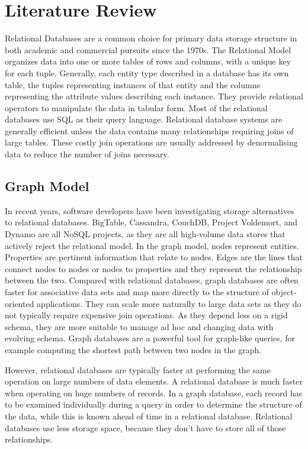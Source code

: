 \documentclass[12pt, oneside]{book}
\begin{document}
\pagebreak

\chapter{Literature Review}
Relational Databases are a common choice for primary data storage structure in both academic and commercial pursuits since the 1970s. The Relational Model organizes data into one or more tables of rows and columns, with a unique key for each tuple. Generally, each entity type described in a database has its own table, the tuples representing instances of that entity and the columns representing the attribute values describing each instance. They provide relational operators to manipulate the data in tabular form. Most of the relational databases use SQL as their query language. Relational database systems are generally efficient unless the data contains many relationships requiring joins of large tables. These costly join operations are usually addressed by denormalising data to reduce the number of joins necessary.  
\section{Graph Model}
In recent years, software developers have been investigating storage alternatives to relational databases. BigTable, Cassandra, CouchDB, Project Voldemort, and Dynamo are all NoSQL projects, as they are all high-volume data stores that actively reject the relational model. In the graph model, nodes represent entities. Properties are pertinent information that relate to nodes. Edges are the lines that connect nodes to nodes or nodes to properties and they represent the relationship between the two. Compared with relational databases, graph databases are often faster for associative data sets and map more directly to the structure of object-oriented applications. They can scale more naturally to large data sets as they do not typically require expensive join operations. As they depend less on a rigid schema, they are more suitable to manage ad hoc and changing data with evolving schema. Graph databases are a powerful tool for graph-like queries, for example computing the shortest path between two nodes in the graph.\\
\par
However, relational databases are typically faster at performing the same operation on large numbers of data elements. A relational database is much faster when operating on huge numbers of records. In a graph database, each record has to be examined individually during a query in order to determine the structure of the data, while this is known ahead of time in a relational database. Relational databases use less storage space, because they don't have to store all of those relationships.
\end{document}
